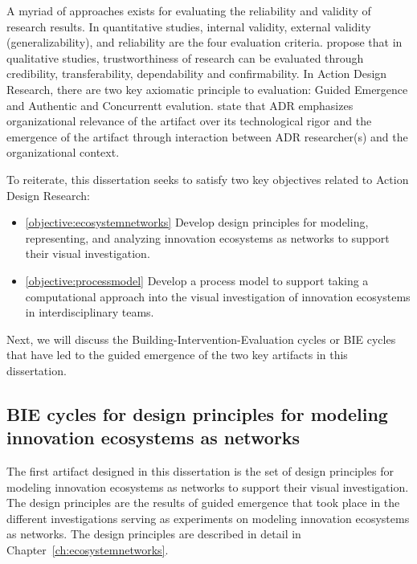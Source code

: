 A myriad of approaches exists for evaluating the reliability and validity of research results. In quantitative studies, internal validity, external validity (generalizability), and reliability are the four evaluation criteria. \cite{Shenton2004StrategiesProjects} propose that in qualitative studies, trustworthiness of research can be evaluated through credibility, transferability, dependability and confirmability. In Action Design Research, there are two key axiomatic principle to evaluation: Guided Emergence and Authentic and Concurrentt evalution. \cite{Sein2011ActionResearch} state that ADR emphasizes organizational relevance of the artifact over its technological rigor and the emergence of the artifact through interaction between ADR researcher(s) and the organizational context.


To reiterate, this dissertation seeks to satisfy two key objectives related to Action Design Research:

\begin{itemize}
	\item\ref{objective:ecosystemnetworks} Develop design principles for modeling, representing, and analyzing innovation ecosystems as networks to support their visual investigation.
    \item\ref{objective:processmodel} Develop a process model to support taking a computational approach into the visual investigation of innovation ecosystems in interdisciplinary teams.
\end{itemize}

Next, we will discuss the Building-Intervention-Evaluation cycles or BIE cycles \citep{Sein2011ActionResearch} that have led to the guided emergence of the two key artifacts in this dissertation.

\subsection{BIE cycles for design principles for modeling innovation ecosystems as networks}

The first artifact designed in this dissertation is the set of design principles for modeling innovation ecosystems as networks to support their visual investigation. The design principles are the results of guided emergence that took place in the different investigations serving as experiments on modeling innovation ecosystems as networks. The design principles are described in detail in Chapter~\ref{ch:ecosystemnetworks}. 

